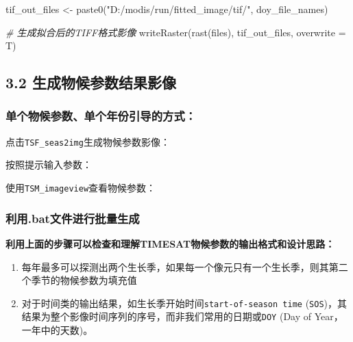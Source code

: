 \documentclass[
]{article}
\newenvironment{Shaded}{\begin{snugshade}}{\end{snugshade}}
\newcommand{\AttributeTok}[1]{\textcolor[rgb]{0.77,0.63,0.00}{#1}}
\newcommand{\CommentTok}[1]{\textcolor[rgb]{0.56,0.35,0.01}{\textit{#1}}}
\newcommand{\FunctionTok}[1]{\textcolor[rgb]{0.00,0.00,0.00}{#1}}
\newcommand{\NormalTok}[1]{#1}
\newcommand{\OtherTok}[1]{\textcolor[rgb]{0.56,0.35,0.01}{#1}}
\newcommand{\StringTok}[1]{\textcolor[rgb]{0.31,0.60,0.02}{#1}}
\begin{document}
\begin{Shaded}
\begin{Highlighting}[]
\NormalTok{tif\_out\_files }\OtherTok{\textless{}{-}} \FunctionTok{paste0}\NormalTok{(}\StringTok{"D:/modis/run/fitted\_image/tif/"}\NormalTok{, doy\_file\_names)}

\CommentTok{\# 生成拟合后的TIFF格式影像}
\FunctionTok{writeRaster}\NormalTok{(}\FunctionTok{rast}\NormalTok{(files), tif\_out\_files, }\AttributeTok{overwrite =}\NormalTok{ T)}
\end{Highlighting}
\end{Shaded}

\hypertarget{ux751fux6210ux7269ux5019ux53c2ux6570ux7ed3ux679cux5f71ux50cf}{%
\subsection{3.2
生成物候参数结果影像}\label{ux751fux6210ux7269ux5019ux53c2ux6570ux7ed3ux679cux5f71ux50cf}}

\hypertarget{ux5355ux4e2aux7269ux5019ux53c2ux6570ux5355ux4e2aux5e74ux4efdux5f15ux5bfcux7684ux65b9ux5f0f}{%
\subsubsection{单个物候参数、单个年份引导的方式：}\label{ux5355ux4e2aux7269ux5019ux53c2ux6570ux5355ux4e2aux5e74ux4efdux5f15ux5bfcux7684ux65b9ux5f0f}}

点击\texttt{TSF\_seas2img}生成物候参数影像：

按照提示输入参数：

使用\texttt{TSM\_imageview}查看物候参数：

\hypertarget{ux5229ux7528.batux6587ux4ef6ux8fdbux884cux6279ux91cfux751fux6210}{%
\subsubsection{利用.bat文件进行批量生成}\label{ux5229ux7528.batux6587ux4ef6ux8fdbux884cux6279ux91cfux751fux6210}}

\textbf{利用上面的步骤可以检查和理解TIMESAT物候参数的输出格式和设计思路：}

\begin{enumerate}
\def\labelenumi{\arabic{enumi}.}
\item
  每年最多可以探测出两个生长季，如果每一个像元只有一个生长季，则其第二个季节的物候参数为填充值
\item
  对于时间类的输出结果，如生长季开始时间\texttt{start-of-season\ time}
  (\texttt{SOS})，其结果为整个影像时间序列的序号，而非我们常用的日期或\texttt{DOY}
  (Day of Year，一年中的天数)。
\end{enumerate}
\end{document}
